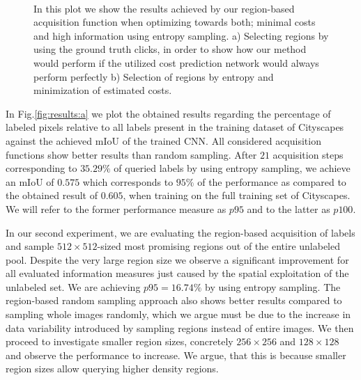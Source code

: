 \documentclass{bmvc2k}
\begin{document}
\begin{figure}[!ht]
\centering
\begin{subfigure}[]{\texttt{[image: figures/results/optimized\_costs]}\label{fig:results:costs}}\end{subfigure}
\begin{subfigure}[]{\texttt{[image: figures/results/est\_optimized\_costs]}\label{fig:results:estimated_costs}}\end{subfigure}\\
\caption{In this plot we show the results achieved by our region-based acquisition function when optimizing towards both; minimal costs and high information using entropy sampling. a) Selecting regions by using the ground truth clicks, in order to show how our method would perform if the utilized cost prediction network would always perform perfectly b) Selection of regions by entropy and minimization of estimated costs.}
\vspace{-0.4cm}
\end{figure}

In Fig.\ref{fig:results:a} we plot the obtained results regarding the percentage of labeled pixels relative to all labels present in the training dataset of Cityscapes against the achieved mIoU of the trained CNN. All considered acquisition functions show better results than random sampling. After $21$ acquisition steps corresponding to $35.29\%$ of queried labels by using entropy sampling, we achieve an mIoU of $0.575$ which corresponds to $95\%$ of the performance as compared to the obtained result of $0.605$, when training on the full training set of Cityscapes. We will refer to the former performance measure as $p95$ and to the latter as $p100$.

In our second experiment, we are evaluating the region-based acquisition of labels and sample $512\times512$-sized most promising regions out of the entire unlabeled pool. Despite the very large region size we observe a significant improvement for all evaluated information measures just caused by the spatial exploitation of the unlabeled set. We are achieving $p95=16.74\%$ by using entropy sampling. The region-based random sampling approach also shows better results compared to sampling whole images randomly, which we argue must be due to the increase in data variability introduced by sampling regions instead of entire images.
We then proceed to investigate smaller region sizes, concretely $256\times256$ and $128\times128$ and observe the performance to increase. We argue, that this is because smaller region sizes allow querying higher density regions.
\end{document}
